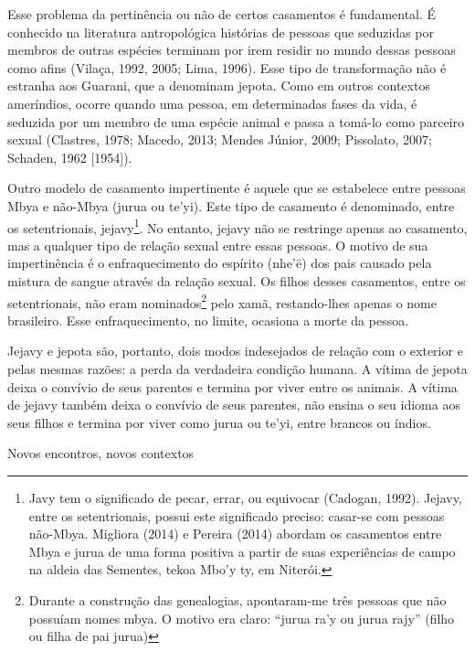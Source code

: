 \documentclass{article}
\begin{document}
Esse problema da pertin\^encia ou n\~ao de certos casamentos \'e
fundamental. \'E conhecido na literatura antropol\'ogica hist\'orias de
pessoas que seduzidas por membros de outras esp\'ecies terminam por
irem residir no mundo dessas pessoas como afins (Vila\c{c}a, 1992,
2005; Lima, 1996). Esse tipo de transforma\c{c}\~ao n\~ao \'e estranha
aos Guarani, que a denominam jepota. Como em outros contextos
amer\'indios, ocorre quando uma pessoa, em determinadas fases da vida,
\'e seduzida por um membro de uma esp\'ecie animal e passa a tom\'a-lo
como parceiro sexual (Clastres, 1978; Macedo, 2013; Mendes J\'unior,
2009; Pissolato, 2007; Schaden, 1962 [1954]).

Outro modelo de casamento impertinente \'e aquele que se estabelece
entre pessoas Mbya e n\~ao-Mbya (jurua ou te{\textquoteright}yi). Este
tipo de casamento \'e denominado, entre os setentrionais,
jejavy\footnote{ Javy tem o significado de pecar, errar, ou equivocar
(Cadogan, 1992).  Jejavy, entre os setentrionais, possui este
significado preciso: casar-se com pessoas n\~ao-Mbya. Migliora (2014) e
Pereira (2014) abordam os casamentos entre Mbya e jurua de uma forma
positiva a partir de suas experi\^encias de campo na aldeia das
Sementes, tekoa Mbo{\textquoteright}y ty, em Niter\'oi.}. No entanto,
jejavy n\~ao se restringe apenas ao casamento, mas a qualquer tipo de
rela\c{c}\~ao sexual entre essas pessoas. O motivo de sua
impertin\^encia \'e o enfraquecimento do esp\'irito
(nhe{\textquoteright}\"e) dos pais causado pela mistura de sangue
atrav\'es da rela\c{c}\~ao sexual. Os filhos desses casamentos, entre
os setentrionais, n\~ao eram nominados\footnote{ Durante a
constru\c{c}\~ao das genealogias, apontaram-me tr\^es pessoas que n\~ao
possu\'iam nomes mbya. O motivo era claro: {\textquotedblleft}jurua
ra{\textquoteright}y ou jurua rajy{\textquotedblright} (filho ou filha
de pai jurua)  } pelo xam\~a, restando-lhes apenas o nome brasileiro.
Esse enfraquecimento, no limite, ocasiona a morte da pessoa.

Jejavy e jepota s\~ao, portanto, dois modos indesejados de rela\c{c}\~ao
com o exterior e pelas mesmas raz\~oes: a perda da verdadeira
condi\c{c}\~ao humana. A v\'itima de jepota deixa o conv\'ivio de seus
parentes e termina por viver entre os animais. A v\'itima de jejavy
tamb\'em deixa o conv\'ivio de seus parentes, n\~ao ensina o seu idioma
aos seus filhos e termina por viver como jurua ou
te{\textquoteright}yi, entre brancos ou \'indios. 

Novos encontros, novos contextos
\end{document}
